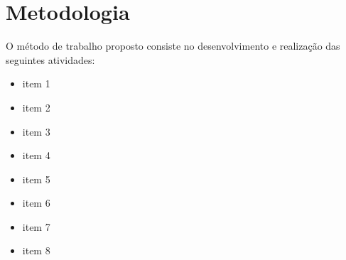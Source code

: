 \section{Metodologia}

O m\'{e}todo de trabalho proposto consiste no desenvolvimento e realiza\c{c}\~{a}o das seguintes atividades:

\begin{itemize}
	\item item 1
	\item item 2 
	\item item 3
	\item item 4
	\item item 5
	\item item 6
	\item item 7
	\item item 8
\end{itemize}

